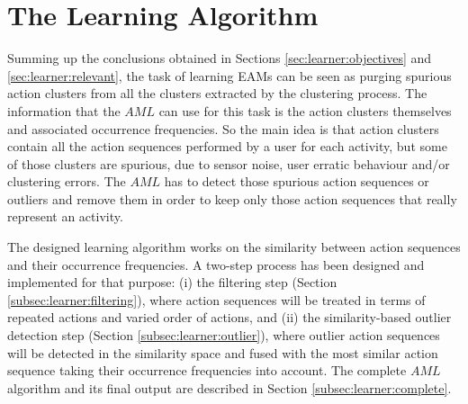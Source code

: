 \section{The Learning Algorithm}
\label{sec:learner:algorithm}






Summing up the conclusions obtained in Sections \ref{sec:learner:objectives} and \ref{sec:learner:relevant}, the task of learning EAMs can be seen as purging spurious action clusters from all the clusters extracted by the clustering process. The information that the $AML$ can use for this task is the action clusters themselves and associated occurrence frequencies. So the main idea is that action clusters contain all the action sequences performed by a user for each activity, but some of those clusters are spurious, due to sensor noise, user erratic behaviour and/or clustering errors. The $AML$ has to detect those spurious action sequences or outliers and remove them in order to keep only those action sequences that really represent an activity.

The designed learning algorithm works on the similarity between action sequences and their occurrence frequencies. A two-step process has been designed and implemented for that purpose: (i) the filtering step (Section \ref{subsec:learner:filtering}), where action sequences will be treated in terms of repeated actions and varied order of actions, and (ii) the similarity-based outlier detection step (Section \ref{subsec:learner:outlier}), where outlier action sequences will be detected in the similarity space and fused with the most similar action sequence taking their occurrence frequencies into account. The complete $AML$ algorithm and its final output are described in Section \ref{subsec:learner:complete}.

